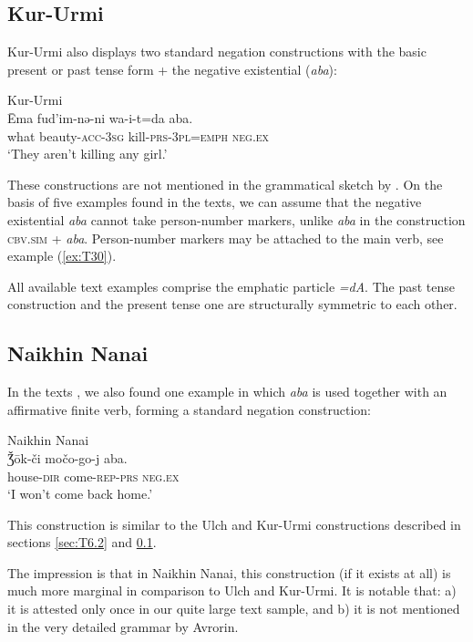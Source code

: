 \documentclass[output=paper,colorlinks,citecolor=brown]{langscibook}
\begin{document}
\subsection{Kur-Urmi}\label{sec:T6.3}

Kur-Urmi also displays two standard negation constructions with the basic present or past tense form + the negative existential (\textit{aba}):

\ea Kur-Urmi \label{ex:T30}\\
	\gll Ēma	fud’im-nə-ni	wa-i-t=da	aba.\\
	what	beauty-\textsc{acc-3sg}	kill-\textsc{prs-3pl=emph}	\textsc{neg.ex}\\
	\glt `They aren’t killing any girl.' \citep[141, text]{sunik1958a}
\z

These constructions are not mentioned in the grammatical sketch by \citet{sunik1958a}. On the basis of five examples found in the texts, we can assume that the negative existential \textit{aba} cannot take person-number markers, unlike \textit{aba} in the construction \textsc{cbv.sim} + \textit{aba}. Person-number markers may be attached to the main verb, see example (\ref{ex:T30}).

All available text examples comprise the emphatic particle \textit{=dA}. The past tense construction and the present tense one are structurally symmetric to each other.

\subsection{Naikhin Nanai}\label{sec:T6.4}

In the texts \citep{avrorin1986a}, we also found one example in which \textit{aba} is used together with an affirmative finite verb, forming a standard negation construction:

\ea Naikhin Nanai \label{ex:T31}\\
	\gll Ǯōk-či	močo-go-j	aba.\\
	house-\textsc{dir}	come-\textsc{rep-prs}	\textsc{neg.ex}\\
	\glt `I won’t come back home.' \citep[192, text]{avrorin1986a}
\z

This construction is similar to the Ulch and Kur-Urmi constructions described in sections \ref{sec:T6.2} and \ref{sec:T6.3}.

The impression is that in Naikhin Nanai, this construction (if it exists at all) is much more marginal in comparison to Ulch and Kur-Urmi. It is notable that: a) it is attested only once in our quite large text sample, and b) it is not mentioned in the very detailed grammar by Avrorin.
\end{document}
